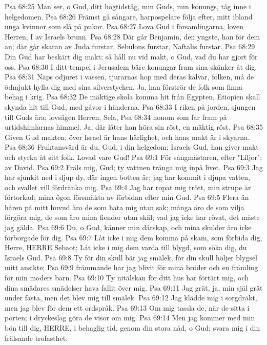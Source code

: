 Psa 68:25  Man ser, o Gud, ditt högtidståg, min Guds, min konungs, tåg inne i helgedomen.
Psa 68:26  Främst gå sångare, harpospelare följa efter, mitt ibland unga kvinnor som slå på pukor.
Psa 68:27  Lova Gud i församlingarna, loven Herren, I av Israels brunn.
Psa 68:28  Där går Benjamin, den yngste, han för dem an; där går skaran av Juda furstar, Sebulons furstar, Naftalis furstar.
Psa 68:29  Din Gud har beskärt dig makt; så håll nu vid makt, o Gud, vad du har gjort för oss.
Psa 68:30  I ditt tempel i Jerusalem bäre konungar fram sina skänker åt dig.
Psa 68:31  Näps odjuret i vassen, tjurarnas hop med deras kalvar, folken, må de ödmjukt hylla dig med sina silverstycken. Ja, han förströr de folk som finna behag i krig.
Psa 68:32  De mäktige skola komma hit från Egypten, Etiopien skall skynda hit till Gud, med gåvor i händerna.
Psa 68:33  I riken på jorden, sjungen till Guds ära; lovsägen Herren, Sela,
Psa 68:34  honom som far fram på urtidshimlarnas himmel. Ja, där låter han höra sin röst, en mäktig röst.
Psa 68:35  Given Gud makten; över Israel är hans härlighet, och hans makt är i skyarna.
Psa 68:36  Fruktansvärd är du, Gud, i din helgedom; Israels Gud, han giver makt och styrka åt sitt folk. Lovad vare Gud!
Psa 69:1  För sångmästaren, efter "Liljor"; av David.
Psa 69:2  Fräls mig, Gud; ty vattnen tränga mig inpå livet.
Psa 69:3  Jag har sjunkit ned i djup dy, där ingen botten är; jag har kommit i djupa vatten, och svallet vill fördränka mig.
Psa 69:4  Jag har ropat mig trött, min strupe är förtorkad; mina ögon försmäkta av förbidan efter min Gud.
Psa 69:5  Flera än håren på mitt huvud äro de som hata mig utan sak; många äro de som vilja förgöra mig, de som äro mina fiender utan skäl; vad jag icke har rövat, det måste jag gälda.
Psa 69:6  Du, o Gud, känner min dårskap, och mina skulder äro icke förborgade för dig.
Psa 69:7  Låt icke i mig dem komma på skam, som förbida dig, Herre, HERRE Sebaot; Låt icke i mig dem varda till blygd, som söka dig, du Israels Gud.
Psa 69:8  Ty för din skull bär jag smälek, för din skull höljer blygsel mitt ansikte;
Psa 69:9  främmande har jag blivit för mina bröder och en främling för min moders barn.
Psa 69:10  Ty nitälskan för ditt hus har förtärt mig, och dina smädares smädelser hava fallit över mig.
Psa 69:11  Jag grät, ja, min själ grät under fasta, men det blev mig till smälek.
Psa 69:12  Jag klädde mig i sorgdräkt, men jag blev för dem ett ordspråk.
Psa 69:13  Om mig tassla de, när de sitta i porten; i dryckeslag göra de visor om mig.
Psa 69:14  Men jag kommer med min bön till dig, HERRE, i behaglig tid, genom din stora nåd, o Gud; svara mig i din frälsande trofasthet.
